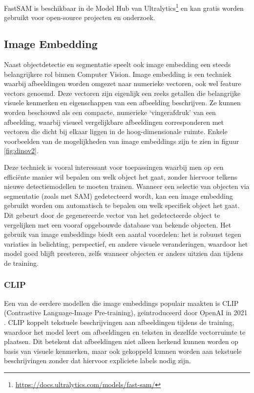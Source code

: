 FastSAM is beschikbaar in de Model Hub van Ultralytics\footnote{\url{https://docs.ultralytics.com/models/fast-sam/}} en kan gratis worden gebruikt voor open-source projecten en onderzoek.

\subsection{Image Embedding}

Naast objectdetectie en segmentatie speelt ook image embedding een steeds belangrijkere rol binnen Computer Vision. 
Image embedding is een techniek waarbij afbeeldingen worden omgezet naar numerieke vectoren, ook wel feature vectors genoemd. 
Deze vectoren zijn eigenlijk een reeks getallen die belangrijke visuele kenmerken en eigenschappen van een afbeelding beschrijven. 
Ze kunnen worden beschouwd als een compacte, numerieke `vingerafdruk' van een afbeelding, waarbij visueel vergelijkbare afbeeldingen corresponderen met vectoren die dicht bij elkaar liggen in de hoog-dimensionale ruimte.
Enkele voorbeelden van de mogelijkheden van image embeddings zijn te zien in figuur \ref{fig:dinov2}.

Deze techniek is vooral interessant voor toepassingen waarbij men op een efficiënte manier wil bepalen om welk object het gaat, zonder hiervoor telkens nieuwe detectiemodellen te moeten trainen. 
Wanneer een selectie van objecten via segmentatie (zoals met SAM) gedetecteerd wordt, kan een image embedding gebruikt worden om automatisch te bepalen om welk specifiek object het gaat. 
Dit gebeurt door de gegenereerde vector van het gedetecteerde object te vergelijken met een vooraf opgebouwde database van bekende objecten. 
Het gebruik van image embeddings biedt een aantal voordelen: het is robuust tegen variaties in belichting, perspectief, en andere visuele veranderingen, waardoor het model goed blijft presteren, zelfs wanneer objecten er anders uitzien dan tijdens de training.

\subsubsection{CLIP}

Een van de eerdere modellen die image embeddings populair maakten is CLIP (Contrastive Language-Image Pre-training), geïntroduceerd door OpenAI in 2021 \autocite{Radford2021}.
CLIP koppelt tekstuele beschrijvingen aan afbeeldingen tijdens de training, waardoor het model leert om afbeeldingen en teksten in dezelfde vectorruimte te plaatsen. 
Dit betekent dat afbeeldingen niet alleen herkend kunnen worden op basis van visuele kenmerken, maar ook gekoppeld kunnen worden aan tekstuele beschrijvingen zonder dat hiervoor expliciete labels nodig zijn.

